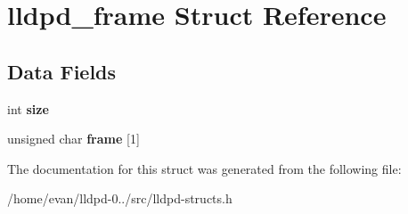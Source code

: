 \section{lldpd\-\_\-frame \-Struct \-Reference}
\label{structlldpd__frame}
\subsection*{\-Data \-Fields}
\begin{DoxyCompactItemize}
\item 
int {\bfseries size}\label{structlldpd__frame_a439227feff9d7f55384e8780cfc2eb82}

\item 
unsigned char {\bfseries frame} [1]\label{structlldpd__frame_a7ca219bc1e4849d42260f80b6a71eed4}

\end{DoxyCompactItemize}


\-The documentation for this struct was generated from the following file\-:\begin{DoxyCompactItemize}
\item 
/home/evan/lldpd-\/0../src/lldpd-\/structs.\-h\end{DoxyCompactItemize}
